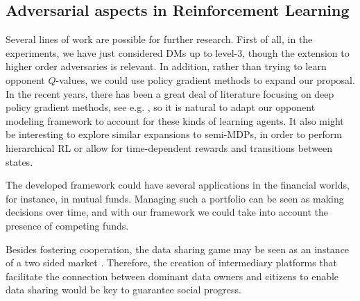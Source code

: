 \subsection{Adversarial aspects in Reinforcement Learning}

Several lines of work are possible for further research. First of all, in the experiments, we have just considered DMs up to level-3,
though the extension to higher order adversaries is relevant. %
In addition, rather than trying to learn opponent $Q$-values, we could
use policy gradient methods \parencite{baxter2000direct} to expand our proposal. In the recent years, there has been a great deal of literature focusing on deep policy gradient methods, see e.g.  \textcite{pmlr-v48-mniha16,schulman2017ppo}, so it is natural to adapt our opponent modeling framework to account for these kinds of learning agents.
It also might be interesting to explore similar expansions to semi-MDPs, 
in order to perform hierarchical RL or allow for time-dependent rewards 
and transitions between states.

The developed framework could have several applications in the financial worlds, for instance, in mutual funds. Managing such a portfolio can be seen as making decisions over time, and with our framework we could take into account the presence of competing funds.

 Besides fostering cooperation,  the data sharing game may be seen as
  an instance of a two sided market \parencite{rochet2006two}. Therefore,
  the creation of intermediary platforms that facilitate the connection between dominant data owners and citizens to enable data sharing
  would be key to guarantee social progress. 